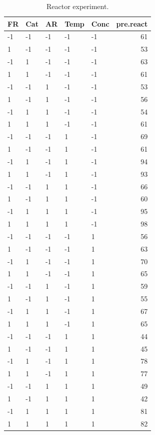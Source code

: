\documentclass[
]{book}
\theoremstyle{definition}
\theoremstyle{definition}
\theoremstyle{definition}
\theoremstyle{definition}
\theoremstyle{remark}
\begin{document}
\begin{enumerate}
\begin{table}
   \caption{\label{tab:reactor-data-2}Reactor experiment.}
   \centering
   \begin{tabular}[t]{l|l|l|l|l|r}
   \hline
   FR & Cat & AR & Temp & Conc & pre.react\\
   \hline
   -1 & -1 & -1 & -1 & -1 & 61\\
   \hline
   1 & -1 & -1 & -1 & -1 & 53\\
   \hline
   -1 & 1 & -1 & -1 & -1 & 63\\
   \hline
   1 & 1 & -1 & -1 & -1 & 61\\
   \hline
   -1 & -1 & 1 & -1 & -1 & 53\\
   \hline
   1 & -1 & 1 & -1 & -1 & 56\\
   \hline
   -1 & 1 & 1 & -1 & -1 & 54\\
   \hline
   1 & 1 & 1 & -1 & -1 & 61\\
   \hline
   -1 & -1 & -1 & 1 & -1 & 69\\
   \hline
   1 & -1 & -1 & 1 & -1 & 61\\
   \hline
   -1 & 1 & -1 & 1 & -1 & 94\\
   \hline
   1 & 1 & -1 & 1 & -1 & 93\\
   \hline
   -1 & -1 & 1 & 1 & -1 & 66\\
   \hline
   1 & -1 & 1 & 1 & -1 & 60\\
   \hline
   -1 & 1 & 1 & 1 & -1 & 95\\
   \hline
   1 & 1 & 1 & 1 & -1 & 98\\
   \hline
   -1 & -1 & -1 & -1 & 1 & 56\\
   \hline
   1 & -1 & -1 & -1 & 1 & 63\\
   \hline
   -1 & 1 & -1 & -1 & 1 & 70\\
   \hline
   1 & 1 & -1 & -1 & 1 & 65\\
   \hline
   -1 & -1 & 1 & -1 & 1 & 59\\
   \hline
   1 & -1 & 1 & -1 & 1 & 55\\
   \hline
   -1 & 1 & 1 & -1 & 1 & 67\\
   \hline
   1 & 1 & 1 & -1 & 1 & 65\\
   \hline
   -1 & -1 & -1 & 1 & 1 & 44\\
   \hline
   1 & -1 & -1 & 1 & 1 & 45\\
   \hline
   -1 & 1 & -1 & 1 & 1 & 78\\
   \hline
   1 & 1 & -1 & 1 & 1 & 77\\
   \hline
   -1 & -1 & 1 & 1 & 1 & 49\\
   \hline
   1 & -1 & 1 & 1 & 1 & 42\\
   \hline
   -1 & 1 & 1 & 1 & 1 & 81\\
   \hline
   1 & 1 & 1 & 1 & 1 & 82\\
   \hline
   \end{tabular}
   \end{table}


\end{enumerate}
\end{document}
